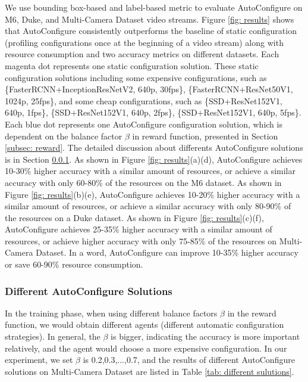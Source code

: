 We use bounding box-based and label-based metric to evaluate AutoConfigure on M6, Duke, and Multi-Camera Dataset video streams. Figure \ref{fig: results} shows that AutoConfigure consistently outperforms the baseline of static configuration (profiling configurations once at the beginning of a video stream) along with resource consumption and two accuracy metrics on different datasets. Each magenta dot represents one static configuration solution. These static configuration solutions including some expensive configurations, such as \{FasterRCNN+InceptionResNetV2, 640p, 30fps\}, \{FasterRCNN+ResNet50V1, 1024p, 25fps\}, and some cheap configurations, such as \{SSD+ResNet152V1, 640p, 1fps\}, \{SSD+ResNet152V1, 640p, 2fps\}, \{SSD+ResNet152V1, 640p, 5fps\}. Each blue dot represents one AutoConfigure configuration solution, which is dependent on the balance factor $\beta$ in reward function, presented in Section \ref{subsec: reward}. The detailed discussion about differents AutoConfigure solutions is in Section \ref{subsec: different sulutions}. As shown in Figure \ref{fig: results}(a)(d), AutoConfigure achieves 10-30\% higher accuracy with a similar amount of resources, or achieve a similar accuracy with only 60-80\% of the resources on the M6 dataset. As shown in Figure \ref{fig: results}(b)(e), AutoConfigure achieves 10-20\% higher accuracy with a similar amount of resources, or achieve a similar accuracy with only 80-90\% of the resources on a Duke dataset. As shown in Figure \ref{fig: results}(c)(f), AutoConfigure achieves 25-35\% higher accuracy with a similar amount of resources, or achieve higher accuracy with only 75-85\% of the resources on Multi-Camera Dataset. In a word, AutoConfigure can improve 10-35\% higher accuracy or save 60-90\% resource consumption.

\subsubsection{Different AutoConfigure Solutions}
\label{subsec: different sulutions}
In the training phase, when using different balance factors $\beta$ in the reward function, we would obtain different agents (different automatic configuration strategies). In general, the $\beta$ is bigger, indicating the accuracy is more important relatively, and the agent would choose a more expensive configuration. In our experiment, we set $\beta$ is 0.2,0.3,...,0.7, and the results of different AutoConfigure solutions on Multi-Camera Dataset are listed in Table \ref{tab: different sulutions}.

